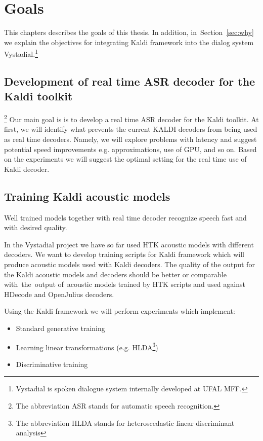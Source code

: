 \chapter{Goals}
\label{cha:goals}
This chapters describes the goals of this thesis. 
In addition, in~Section~\ref{sec:why} we explain the objectives for integrating Kaldi framework into the dialog system Vystadial.\footnote{Vystadial is spoken dialogue system internally developed at UFAL MFF.} 

\section{Development of real time ASR decoder for the Kaldi toolkit}\footnote{The abbreviation ASR stands for automatic speech recognition.} 
\label{sec:development_of_real_time_asr_decoder_for_the_kaldi_toolkit}
Our main goal is is to develop a real time ASR decoder for the Kaldi toolkit. At first, we will identify what prevents the current KALDI decoders from being used as real time decoders. Namely, we will explore problems with latency and suggest potential speed improvements e.g. approximations, use of GPU, and so on. Based on the experiments we will suggest the optimal setting for the real time use of Kaldi decoder.


\section{Training Kaldi acoustic models} 
\label{sec:training_kaldi_acoustic_models}
Well trained models together with real time decoder recognize speech fast and with desired quality.

In the Vystadial project we have so far used HTK acoustic models with different decoders.
We want to develop training scripts for Kaldi framework which will produce acoustic models used with Kaldi decoders. The quality of the output for the Kaldi acoustic models and decoders should be better or comparable with~the~output of~acoustic models trained by HTK scripts and used against HDecode and OpenJulius decoders.

Using the Kaldi framework we will perform experiments which implement:
\begin{itemize}
    \item Standard generative training
    \item Learning linear transformations (e.g. HLDA\footnote{The abbreviation HLDA stands for heteroscedastic linear discriminant analysis})
    \item Discriminative training 
\end{itemize}

